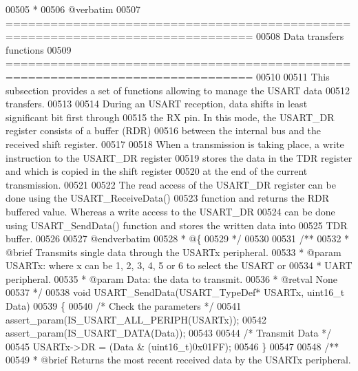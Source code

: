 \begin{DoxyCode}
00505 \textcolor{comment}{ *}
00506 \textcolor{comment}{@verbatim   }
00507 \textcolor{comment}{ ===============================================================================}
00508 \textcolor{comment}{                            Data transfers functions}
00509 \textcolor{comment}{ ===============================================================================  }
00510 \textcolor{comment}{}
00511 \textcolor{comment}{  This subsection provides a set of functions allowing to manage the USART data }
00512 \textcolor{comment}{  transfers.}
00513 \textcolor{comment}{  }
00514 \textcolor{comment}{  During an USART reception, data shifts in least significant bit first through }
00515 \textcolor{comment}{  the RX pin. In this mode, the USART\_DR register consists of a buffer (RDR) }
00516 \textcolor{comment}{  between the internal bus and the received shift register.}
00517 \textcolor{comment}{}
00518 \textcolor{comment}{  When a transmission is taking place, a write instruction to the USART\_DR register }
00519 \textcolor{comment}{  stores the data in the TDR register and which is copied in the shift register }
00520 \textcolor{comment}{  at the end of the current transmission.}
00521 \textcolor{comment}{}
00522 \textcolor{comment}{  The read access of the USART\_DR register can be done using the USART\_ReceiveData()}
00523 \textcolor{comment}{  function and returns the RDR buffered value. Whereas a write access to the USART\_DR }
00524 \textcolor{comment}{  can be done using USART\_SendData() function and stores the written data into }
00525 \textcolor{comment}{  TDR buffer.}
00526 \textcolor{comment}{}
00527 \textcolor{comment}{@endverbatim}
00528 \textcolor{comment}{  * @\{}
00529 \textcolor{comment}{  */}
00530 
00531 \textcolor{comment}{/**}
00532 \textcolor{comment}{  * @brief  Transmits single data through the USARTx peripheral.}
00533 \textcolor{comment}{  * @param  USARTx: where x can be 1, 2, 3, 4, 5 or 6 to select the USART or }
00534 \textcolor{comment}{  *         UART peripheral.}
00535 \textcolor{comment}{  * @param  Data: the data to transmit.}
00536 \textcolor{comment}{  * @retval None}
00537 \textcolor{comment}{  */}
00538 \textcolor{keywordtype}{void} USART_SendData(USART\_TypeDef* USARTx, uint16\_t Data)
00539 \{
00540   \textcolor{comment}{/* Check the parameters */}
00541   assert_param(IS\_USART\_ALL\_PERIPH(USARTx));
00542   assert_param(IS\_USART\_DATA(Data));
00543 
00544   \textcolor{comment}{/* Transmit Data */}
00545   USARTx->DR = (Data & (uint16\_t)0x01FF);
00546 \}
00547 
00548 \textcolor{comment}{/**}
00549 \textcolor{comment}{  * @brief  Returns the most recent received data by the USARTx peripheral.}

\end{DoxyCode}

